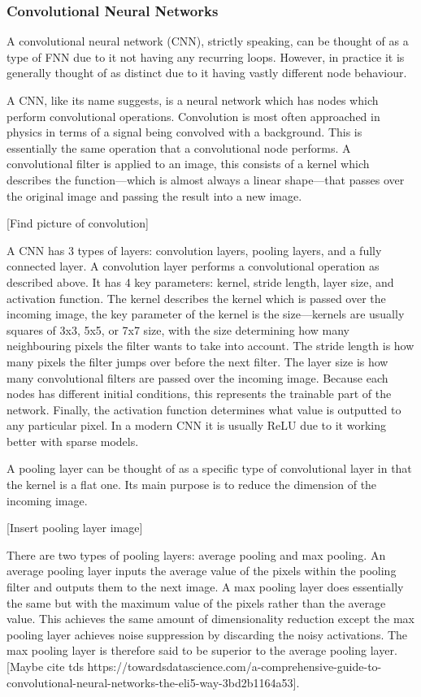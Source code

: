 \documentclass[a4paper,fleqn,usenatbib]{mnras}
\begin{document}
\subsubsection{Convolutional Neural Networks}
A convolutional neural network (CNN), strictly speaking, can be thought of as a type of FNN due to it not having any recurring loops. However, in practice it is generally thought of as distinct due to it having vastly different node behaviour. 

A CNN, like its name suggests, is a neural network which has nodes which perform convolutional operations. Convolution is most often approached in physics in terms of a signal being convolved with a background. This is essentially the same operation that a convolutional node performs. A convolutional filter is applied to an image, this consists of a kernel which describes the function---which is almost always a linear shape---that passes over the original image and passing the result into a new image. 

[Find picture of convolution]

A CNN has 3 types of layers: convolution layers, pooling layers, and a fully connected layer. A convolution layer performs a convolutional operation as described above. It has 4 key parameters: kernel, stride length, layer size, and activation function. The kernel describes the kernel which is passed over the incoming image, the key parameter of the kernel is the size---kernels are usually squares of 3x3, 5x5, or 7x7 size, with the size determining how many neighbouring pixels the filter wants to take into account. The stride length is how many pixels the filter jumps over before the next filter. The layer size is how many convolutional filters are passed over the incoming image. Because each nodes has different initial conditions, this represents the trainable part of the network. Finally, the activation function determines what value is outputted to any particular pixel. In a modern CNN it is usually ReLU due to it working better with sparse models. \cite{CNNSparse}

A pooling layer can be thought of as a specific type of convolutional layer in that the kernel is a flat one. Its main purpose is to reduce the dimension of the incoming image. 

[Insert pooling layer image]

There are two types of pooling layers: average pooling and max pooling. An average pooling layer inputs the average value of the pixels within the pooling filter and outputs them to the next image. A max pooling layer does essentially the same but with the maximum value of the pixels rather than the average value. This achieves the same amount of dimensionality reduction except the max pooling layer achieves noise suppression by discarding the noisy activations. The max pooling layer is therefore said to be superior to the average pooling layer. [Maybe cite tds https://towardsdatascience.com/a-comprehensive-guide-to-convolutional-neural-networks-the-eli5-way-3bd2b1164a53]. 
\end{document}
